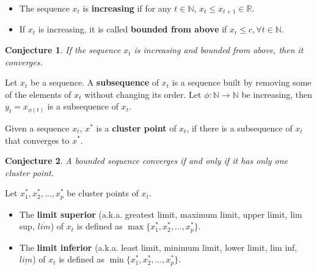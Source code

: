 \documentclass[aspectratio=169]{beamer}
\newtheorem{proposition}{Conjecture}[section]
\begin{document}
\begin{frame}
    \begin{definition}
    \begin{itemize}
        \item The sequence $x_t$ is \textbf{increasing} if for any $t\in\mathds{N}$, $x_t\leq x_{t+1}\in\mathds{R}$.
        \item If $x_t$ is increasing, it is called \textbf{bounded from above} if $x_t\leq c, \forall t\in\mathds{N}$.
    \end{itemize}
    \end{definition}
    
    \begin{proposition}
        If the sequence $x_t$ is increasing and bounded from above, then it converges.
    \end{proposition}
\end{frame}

\begin{frame}
    \begin{definition}
        Let $x_t$ be a sequence. A \textbf{subsequence} of $x_t$ is a sequence built by removing some of the elements of $x_t$ without changing its order. Let $\phi:\mathds{N}\rightarrow\mathds{N}$ be increasing, then $y_t=x_{\phi(t)}$ is a subsequence of $x_t$.
    \end{definition}
    
    \begin{definition}
        Given a sequence $x_t$, $x^*$ is a \textbf{cluster point} of $x_t$, if there is a subsequence of $x_t$ that converges to $x^*$.
    \end{definition}
\end{frame}

\begin{frame}
\begin{proposition}
    A bounded sequence converges if and only if it has only one cluster point.
\end{proposition}
    
\end{frame}

\begin{frame}

Let $x_1^*,x_2^*,...,x_p^*$ be cluster points of $x_t$.

\begin{definition}
\begin{itemize}
    \item The \textbf{limit superior} (a.k.a. greatest limit, maximum limit, upper limit, lim sup, $\overline{lim}$) of $x_t$ is defined as $\max\{x_1^*,x_2^*,...,x_p^*\}$.
    \item The \textbf{limit inferior} (a.k.a. least limit, minimum limit, lower limit, lim inf, $\underline{lim}$) of $x_t$ is defined as $\min\{x_1^*,x_2^*,...,x_p^*\}$.
\end{itemize}
\end{definition}
    
\end{frame}
\end{document}
